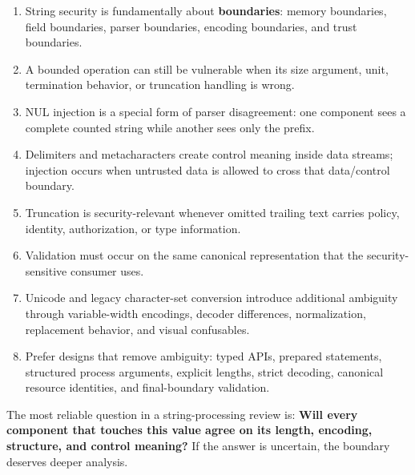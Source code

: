 \documentclass[11pt]{article}
\begin{document}
\begin{enumerate}
  \item String security is fundamentally about \textbf{boundaries}: memory boundaries, field boundaries, parser boundaries, encoding boundaries, and trust boundaries.
  \item A bounded operation can still be vulnerable when its size argument, unit, termination behavior, or truncation handling is wrong.
  \item NUL injection is a special form of parser disagreement: one component sees a complete counted string while another sees only the prefix.
  \item Delimiters and metacharacters create control meaning inside data streams; injection occurs when untrusted data is allowed to cross that data/control boundary.
  \item Truncation is security-relevant whenever omitted trailing text carries policy, identity, authorization, or type information.
  \item Validation must occur on the same canonical representation that the security-sensitive consumer uses.
  \item Unicode and legacy character-set conversion introduce additional ambiguity through variable-width encodings, decoder differences, normalization, replacement behavior, and visual confusables.
  \item Prefer designs that remove ambiguity: typed APIs, prepared statements, structured process arguments, explicit lengths, strict decoding, canonical resource identities, and final-boundary validation.
\end{enumerate}

\begin{securityprinciple}
The most reliable question in a string-processing review is: \textbf{Will every component that touches this value agree on its length, encoding, structure, and control meaning?} If the answer is uncertain, the boundary deserves deeper analysis.
\end{securityprinciple}
\end{document}
